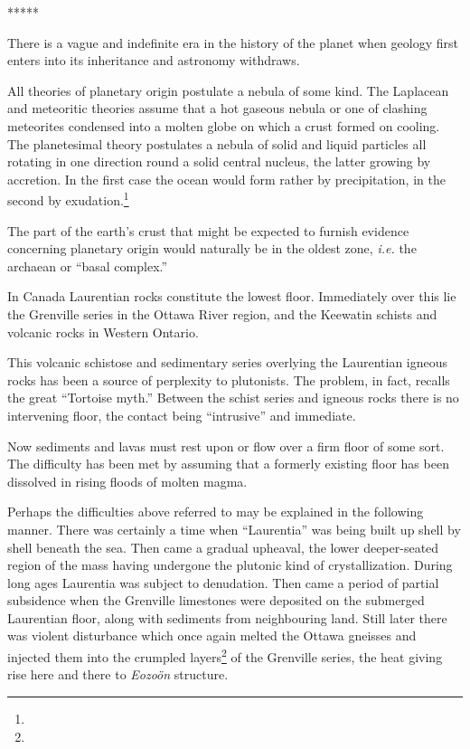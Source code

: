 \documentclass[a4paper, 12pt, oneside]{article}
\begin{document}
\centerline{*\hspace{15mm}*\hspace{15mm}*\hspace{15mm}*\hspace{15mm}*}
\bigskip

There is a vague and indefinite era in the history of the planet when geology first enters into its inheritance and astronomy withdraws.

All theories of planetary origin postulate a nebula of some kind. The Laplacean and meteoritic theories assume that a hot gaseous nebula or one of clashing meteorites condensed into a molten globe on which a crust formed on cooling. The planetesimal theory postulates a nebula of solid and liquid particles all rotating in one direction round a solid central nucleus, the latter growing by accretion. In the first case the ocean would form rather by precipitation, in the second by exudation.\footnote{}

The part of the earth's crust that might be expected to furnish evidence concerning planetary origin would naturally be in the oldest zone, \emph{i.e.} the archaean or ``basal complex.''

In Canada Laurentian rocks constitute the lowest floor. Immediately over this lie the Grenville series in the Ottawa River region, and the Keewatin schists and volcanic rocks in Western Ontario.

This volcanic schistose and sedimentary series overlying the Laurentian igneous rocks has been a source of perplexity to plutonists. The problem, in fact, recalls the great ``Tortoise myth.'' Between the schist series and igneous rocks there is no intervening floor, the contact being ``intrusive'' and immediate.

Now sediments and lavas must rest upon or flow over a firm floor of some sort. The difficulty has been met by assuming that a formerly existing floor has been dissolved in rising floods of molten magma.

Perhaps the difficulties above referred to may be explained in the following manner. There was certainly a time when ``Laurentia'' was being built up shell by shell beneath the sea. Then came a gradual upheaval, the lower deeper-seated region of the mass having undergone the plutonic kind of crystallization. During long ages Laurentia was subject to denudation. Then came a period of partial subsidence when the Grenville limestones were deposited on the submerged Laurentian floor, along with sediments from neighbouring land. Still later there was violent disturbance which once again melted the Ottawa gneisses and injected them into the crumpled layers\footnote{} of the Grenville series, the heat giving rise here and there to \emph{Eozoön} structure.
\end{document}
